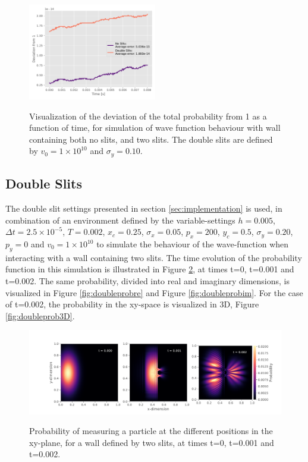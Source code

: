 \documentclass[10pt, nofootinbib, twocolumn]{revtex4-1}
\begin{document}
\begin{figure}[H]
    \caption{Visualization of the deviation of the total probability from 1 as a function of time, for simulation of wave function behaviour with wall containing both no slits, and two slits. The double slits are defined by $v_0 = 1\times10^{10}$ and $\sigma_y = 0.10$.}
    \centering
    \includegraphics[width = 0.5\textwidth]{figures/deviation.pdf} 
    \label{fig:prob7}
\end{figure} 


\subsection{Double Slits}
The double slit settings presented in section \ref{sec:implementation} is used, in combination of an environment defined by the variable-settings $h = 0.005$, $\Delta t = 2.5\times10^{-5}$, $T = 0.002$, $x_c = 0.25$, $\sigma_x = 0.05$, $p_x = 200$, $y_c = 0.5$, $\sigma_y = 0.20$, $p_y = 0$ and $v_0 = 1\times10^{10}$ to simulate the behaviour of the wave-function when interacting with a wall containing two slits. The time evolution of the probability function in this simulation is illustrated in Figure \ref{fig:doubleprob}, at times t=0, t=0.001 and t=0.002. The same probability, divided into real and imaginary dimensions, is visualized in Figure \ref{fig:doubleprobre} and Figure \ref{fig:doubleprobim}. For the case of t=0.002, the probability in the xy-space is visualized in 3D, Figure \ref{fig:doubleprob3D}. 

\begin{figure}
    \caption{Probability of measuring a particle at the different positions in the xy-plane, for a wall defined by two slits, at times t=0, t=0.001 and t=0.002.}
    \centering
    \includegraphics[width = 1\textwidth]{figures/plots_both.pdf} 
    \label{fig:doubleprob}
\end{figure} 
\end{document}
